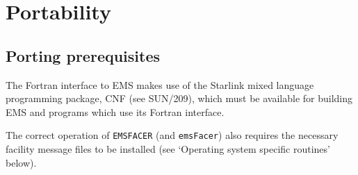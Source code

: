 \documentclass[twoside,11pt]{article}
\newcommand{\htmlref}[2]{#1}
\newcommand{\latex}[1]{#1}
\newcommand{\xref}[3]{#1}
\newcommand{\xlabel}[1]{}
\renewcommand{\_}{\texttt{\symbol{95}}}
\begin{document}
\newpage
\section{\xlabel{portability}Portability}

\subsection{\xlabel{porting_prerequisites}Porting prerequisites}
The Fortran interface to EMS makes use of the Starlink mixed language
programming package,
\xref{CNF}{sun209}{}\latex{ (see SUN/209)},
which must be available for building EMS and programs which use its Fortran
interface.

The correct operation of \texttt{EMS\_FACER} (and \texttt{emsFacer}) also
requires the necessary facility message files to be installed (see 
\htmlref{`Operating system specific routines'\latex{ below}}
{operating_system_specific_routines}).
\end{document}
